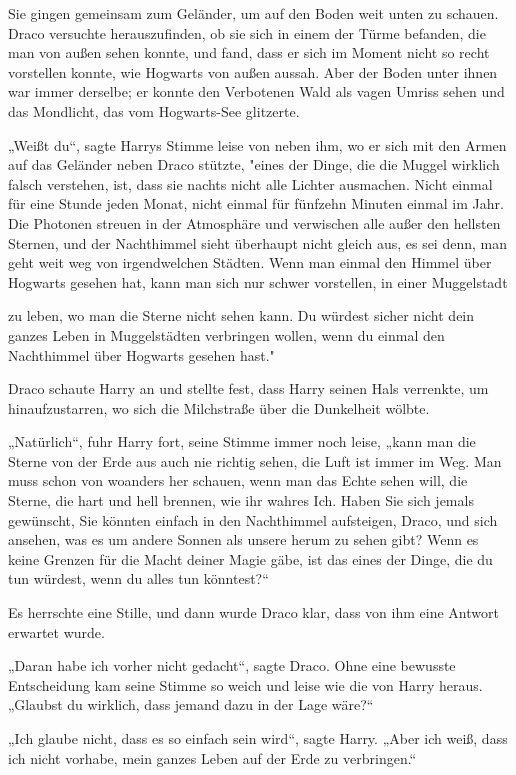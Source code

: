 {Sie gingen gemeinsam zum Geländer, um auf den Boden weit unten zu schauen. Draco versuchte herauszufinden, ob sie sich in einem der Türme befanden, die man von außen sehen konnte, und fand, dass er sich im Moment nicht so recht vorstellen konnte, wie Hogwarts von außen aussah. Aber der Boden unter ihnen war immer derselbe; er konnte den Verbotenen Wald als vagen Umriss sehen und das Mondlicht, das vom Hogwarts-See glitzerte.

„Weißt du“, sagte Harrys Stimme leise von neben ihm, wo er sich mit den Armen auf das Geländer neben Draco stützte, "eines der Dinge, die die Muggel wirklich falsch verstehen, ist, dass sie nachts nicht alle Lichter ausmachen. Nicht einmal für eine Stunde jeden Monat, nicht einmal für fünfzehn Minuten einmal im Jahr. Die Photonen streuen in der Atmosphäre und verwischen alle außer den hellsten Sternen, und der Nachthimmel sieht überhaupt nicht gleich aus, es sei denn, man geht weit weg von irgendwelchen Städten. Wenn man einmal den Himmel über Hogwarts gesehen hat, kann man sich nur schwer vorstellen, in einer Muggelstadt

zu leben, wo man die Sterne nicht sehen kann. Du würdest sicher nicht dein ganzes Leben in Muggelstädten verbringen wollen, wenn du einmal den Nachthimmel über Hogwarts gesehen hast."

Draco schaute Harry an und stellte fest, dass Harry seinen Hals verrenkte, um hinaufzustarren, wo sich die Milchstraße über die Dunkelheit wölbte.

„Natürlich“, fuhr Harry fort, seine Stimme immer noch leise, „kann man die Sterne von der Erde aus auch nie richtig sehen, die Luft ist immer im Weg. Man muss schon von woanders her schauen, wenn man das Echte sehen will, die Sterne, die hart und hell brennen, wie ihr wahres Ich. Haben Sie sich jemals gewünscht, Sie könnten einfach in den Nachthimmel aufsteigen, Draco, und sich ansehen, was es um andere Sonnen als unsere herum zu sehen gibt? Wenn es keine Grenzen für die Macht deiner Magie gäbe, ist das eines der Dinge, die du tun würdest, wenn du alles tun könntest?“

Es herrschte eine Stille, und dann wurde Draco klar, dass von ihm eine Antwort erwartet wurde.

„Daran habe ich vorher nicht gedacht“, sagte Draco. Ohne eine bewusste Entscheidung kam seine Stimme so weich und leise wie die von Harry heraus. „Glaubst du wirklich, dass jemand dazu in der Lage wäre?“

„Ich glaube nicht, dass es so einfach sein wird“, sagte Harry. „Aber ich weiß, dass ich nicht vorhabe, mein ganzes Leben auf der Erde zu verbringen.“

}
